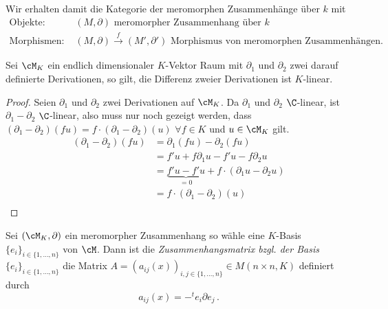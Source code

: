 \begin{defn}
Wir erhalten damit die Kategorie der meromorphen Zusammenhänge über $k$ mit
\begin{align*}
\text{Objekte: } & (M,\partial)\text{ meromorpher Zusammenhang über }k
\\\text{Morphismen: } & (M,\partial)\overset{f}{\rightarrow}(M',\partial')
  \text{ Morphismus von meromorphen Zusammenhängen.}
\end{align*}
\end{defn}

\begin{lem} Sei $\cM_K$ ein endlich dimensionaler $K$-Vektor Raum mit
$\partial_1$ und $\partial_2$ zwei darauf definierte Derivationen, so gilt, die
Differenz zweier Derivationen ist $K$-linear.
\end{lem}
\begin{proof}
Seien $\partial_1$ und $\partial_2$ zwei Derivationen auf $\cM_K$.
Da $\partial_1$ und $\partial_2$ $\C$-linear, ist $\partial_1-\partial_2$
$\C$-linear, also muss nur noch gezeigt werden, dass
$(\partial_1-\partial_2)(fu)=f\cdot(\partial_1-\partial_2)(u)$ $\forall f\in
K$ und $u\in\cM_K$ gilt.\\
\begin{align*}
(\partial_1-\partial_2)(fu) &= \partial_1(fu)-\partial_2(fu)\\
&= f'u+f\partial_1u-f'u-f\partial_2u\\
&= \underset{=0}{\underbrace{f'u-f'u}}+f\cdot(\partial_1u-\partial_2u)\\
&= f\cdot(\partial_1-\partial_2)(u)\\
\end{align*}
\end{proof}
\begin{comment}
\begin{cor}
Für $(K^r,\partial)$ ein meromorpher Zusammenhang existiert ein $A\in M(r\times
r,K)$, so dass $\partial=\frac{d}{dx}-A$.
\end{cor}
\begin{proof}
Es sei $(K^r,\partial)$ ein meromorpher Zusammenhang.  So ist
$\frac{d}{dx}-\partial:K^r\rightarrow K^r$ $K$-linear, also lässt sich durch
eine Matrix $A\in M(r\times r,K)$ darstellen
, also ist, wie
behauptet, $\partial=\frac{d}{dx}-A$.
\end{proof}
\end{comment}

\begin{comment}
\cite[Seite 129]{hotta2007d}
\end{comment}
\begin{defn}[Zusammenhangsmatrix]
Sei $(\cM_K,\partial)$ ein meromorpher Zusammenhang so wähle eine $K$-Basis
$\{e_i\}_{i\in\{1,\dots,n\}}$ von $\cM$. Dann ist die
\emph{Zusammenhangsmatrix bzgl. der Basis $\{e_i\}_{i\in\{1,\dots,n\}}$} die
Matrix $A=(a_{ij}(x))_{i,j\in\{1,\dots,n\}}\in M(n\times n,K)$ definiert
durch
\[ a_{ij}(x) = -^te_i \partial e_j \,. \]
\end{defn}


